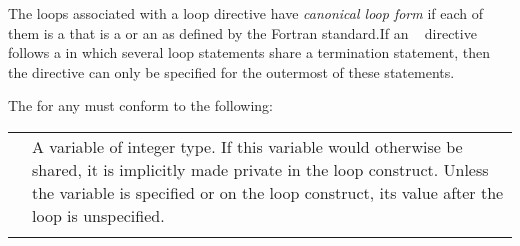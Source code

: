 \begin{fortranspecific}

The loops associated with a loop directive have \emph{canonical loop form} if
each of them is a  that is a  or an
 as defined by the Fortran standard.If an
~ directive follows a  in which several
loop statements share a  termination statement, then the directive
can only be specified for the outermost of these  statements.

The  for any  must conform to the following:

\medskip
\nolinenumbers
\renewcommand{\arraystretch}{1.0}
\tablelasttail{\hline}
\begin{supertabular}{ p{0.8in} p{4.5in}}
    {} & A variable of integer type. If this variable would
    otherwise be shared, it is implicitly made private in the loop construct.
    Unless the variable is specified {} or {}
    on the loop construct, its value after the loop is unspecified.\\
    & \\


\end{supertabular}
\end{fortranspecific}
